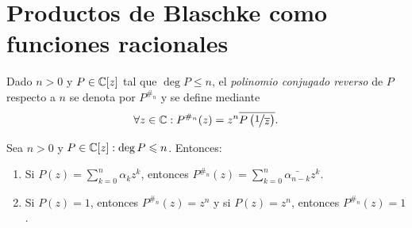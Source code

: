 \section{Productos de Blaschke como funciones racionales}

\begin{defn}\label{defn:polinomio-conjugado-reverso}
    Dado $n > 0$ y $P \in \mathbb{C}[z]$ tal que $\deg P \leq n$, el \emph{polinomio conjugado reverso} de $P$ respecto a $n$ se denota por $P^{\#_n}$ y se define mediante 
    \[
    \forall z \in \C : P^{\#_n}(z) = z^n \bar{P \left(\sfrac{1}{\bar{z}}\right)}.
    \]
\end{defn}

\begin{obs}
    Sea $n > 0$ y $P \in \mathbb{C}[z] : \deg P \leqslant n$. Entonces:
    \begin{enumerate}[label=(\arabic*)]
        \item Si $P(z) = \sum_{k=0}^n \alpha_k z^k$, entonces $P^{\#_n}(z) = \sum_{k=0}^n \bar{\alpha_{n-k}} z^k$.
        \item Si $P(z) = 1$, entonces $P^{\#_n}(z) = z^n$ y si $P(z) = z^n$, entonces $P^{\#_n}(z) = 1$.
    \end{enumerate}
\end{obs}

